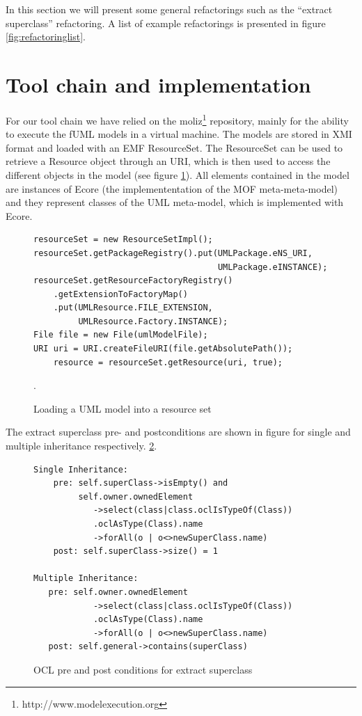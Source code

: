 \documentclass{llncs}
\begin{document}
In this section we will present some general refactorings such as the ``extract superclass'' refactoring. A list of example refactorings
is presented in figure \ref{fig:refactoringlist}.

\section{Tool chain and implementation}
\label{sec:toolchain}
For our tool chain we have relied on the moliz\footnote{http://www.modelexecution.org} repository, mainly for the ability to execute the fUML 
models in a virtual machine. The models are stored in XMI format and loaded with an EMF ResourceSet. The ResourceSet
can be used to retrieve a Resource object through an URI, which is then used to access the different objects in the model 
(see figure \ref{lst:resourceset}). All elements contained in the model are instances of Ecore (the implemententation of
the MOF meta-meta-model) and they represent classes of the UML meta-model, which is implemented with Ecore.

\begin{figure}
 \begin{lstlisting}
resourceSet = new ResourceSetImpl();
resourceSet.getPackageRegistry().put(UMLPackage.eNS_URI,
                                     UMLPackage.eINSTANCE);
resourceSet.getResourceFactoryRegistry()
    .getExtensionToFactoryMap()
    .put(UMLResource.FILE_EXTENSION,
         UMLResource.Factory.INSTANCE);
File file = new File(umlModelFile);
URI uri = URI.createFileURI(file.getAbsolutePath());
    resource = resourceSet.getResource(uri, true);
 \end{lstlisting}
 \caption{Loading a UML model into a resource set}.
 \label{lst:resourceset}
\end{figure}

The extract superclass pre- and postconditions are shown in figure for single and multiple inheritance respectively.
\ref{lst:oclsuperclass}.

\begin{figure}[h!t]
 \begin{lstlisting}
Single Inheritance:
    pre: self.superClass->isEmpty() and 
         self.owner.ownedElement
            ->select(class|class.oclIsTypeOf(Class))
            .oclAsType(Class).name
            ->forAll(o | o<>newSuperClass.name)
    post: self.superClass->size() = 1

Multiple Inheritance:
   pre: self.owner.ownedElement
            ->select(class|class.oclIsTypeOf(Class))
            .oclAsType(Class).name
            ->forAll(o | o<>newSuperClass.name)
   post: self.general->contains(superClass)
 \end{lstlisting}
 \caption{OCL pre and post conditions for extract superclass}
 \label{lst:oclsuperclass}
\end{figure}
\end{document}

